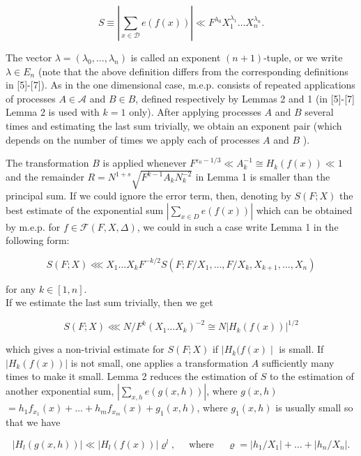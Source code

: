 \documentclass[10pt]{article}
\begin{document}
$$
S \equiv\left|\sum_{x \in \mathscr{D}} e(f(x))\right| \ll F^{\lambda_{0}} X_{1}^{\lambda_{1}} \ldots X_{n}^{\lambda_{n}} .
$$

The vector $\lambda=\left(\lambda_{0}, \ldots, \lambda_{n}\right)$ is called an exponent $(n+1)$-tuple, or we write $\lambda \in E_{n}$ (note that the above definition differs from the corresponding definitions in [5]-[7]). As in the one dimensional case, m.e.p. consists of repeated applications of processes $A \in \mathscr{A}$ and $B \in B$, defined respectively by Lemmas 2 and 1 (in [5]-[7] Lemma 2 is used with $k=1$ only). After applying processes $A$ and $B$ several times and estimating the last sum trivially, we obtain an exponent pair (which depends on the number of times we apply each of processes $A$ and $B$ ).

The transformation $B$ is applied whenever $F^{\varepsilon_{0}-1 / 3} \ll A_{k}^{-1} \cong H_{k}(f(x)) \ll 1$ and the remainder $R=N^{1+s} \sqrt{F^{k-1} A_{k} N_{k}^{-2}}$ in Lemma 1 is smaller than the principal sum. If we could ignore the error term, then, denoting by $S(F ; X)$ the best estimate of the exponential sum $\left|\sum_{x \in D} e(f(x))\right|$ which can be obtained by m.e.p. for $f \in \mathscr{F}(F, X, \Delta)$, we could in such a case write Lemma 1 in the following form:


\begin{equation*}
S(F ; X) \lll X_{1} \ldots X_{k} F^{-k / 2} S\left(F ; F / X_{1}, \ldots, F / X_{k}, X_{k+1}, \ldots, X_{n}\right) \tag{1}
\end{equation*}


for any $k \in[1, n]$.\\
If we estimate the last sum trivially, then we get


\begin{equation*}
S(F ; X) \lll N / F^{k}\left(X_{1} \ldots X_{k}\right)^{-2} \cong N\left|H_{k}(f(x))\right|^{1 / 2} \tag{2}
\end{equation*}


which gives a non-trivial estimate for $S(F ; X)$ if $\mid H_{k}(f(x) \mid$ is small. If $\left|H_{k}(f(x))\right|$ is not small, one applies a transformation $A$ sufficiently many times to make it small. Lemma 2 reduces the estimation of $S$ to the estimation of another exponential sum, $\left|\sum_{x, h} e(g(x, h))\right|$, where $g(x, h)$ $=h_{1} f_{x_{1}}(x)+\ldots+h_{m} f_{x_{m}}(x)+g_{1}(x, h)$, where $g_{1}(x, h)$ is usually small so that we have

$$
\left|H_{l}(g(x, h))\right| \ll\left|H_{l}(f(x))\right| \varrho^{l}, \quad \text { where } \quad \varrho=\left|h_{1} / X_{1}\right|+\ldots+\left|h_{n} / X_{n}\right| .
$$
\end{document}
